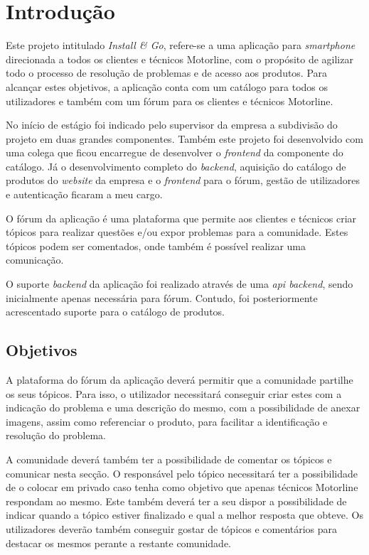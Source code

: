 
\chapter{Introdução}
Este projeto intitulado \textit{Install \& Go}, refere-se a uma aplicação para \textit{smartphone} direcionada a todos os clientes e 
técnicos Motorline, com o propósito de agilizar todo o processo de resolução de problemas e de acesso 
aos produtos. Para alcançar estes objetivos, a aplicação conta com um catálogo para todos os utilizadores 
e também com um fórum para os clientes e técnicos Motorline.

No início de estágio foi indicado pelo supervisor da empresa a subdivisão do projeto em duas grandes componentes. Também este projeto foi desenvolvido com uma colega que ficou encarregue de desenvolver o \textit{frontend} da componente do catálogo. Já o desenvolvimento completo do \textit{backend}, aquisição do catálogo de produtos do \textit{website} da empresa e o \textit{frontend} para o fórum, gestão de utilizadores e autenticação ficaram a meu cargo.

O fórum da aplicação é uma plataforma que permite aos clientes e técnicos criar tópicos para realizar questões e/ou expor problemas para a comunidade. Estes tópicos podem ser comentados, onde também é possível realizar uma comunicação.

O suporte \textit{backend} da aplicação foi realizado através de uma \textit{api backend}, sendo inicialmente apenas necessária para fórum. Contudo, foi posteriormente acrescentado suporte para o catálogo de produtos.

\newpage

\section{Objetivos}
A plataforma do fórum da aplicação deverá permitir que a comunidade partilhe os seus tópicos. Para isso, o utilizador necessitará conseguir criar estes com a indicação do problema e uma descrição do mesmo, com a possibilidade de anexar imagens, assim como referenciar o produto, para facilitar a identificação e resolução do problema.

A comunidade deverá também ter a possibilidade de comentar os tópicos e comunicar nesta secção. O responsável pelo tópico necessitará ter a possibilidade de o colocar em privado caso tenha como objetivo que apenas técnicos Motorline respondam ao mesmo. Este também deverá ter a seu dispor a possibilidade de indicar quando a tópico estiver finalizado e qual a melhor resposta que obteve. Os utilizadores deverão também conseguir gostar de tópicos e comentários para destacar os mesmos perante a restante comunidade.

